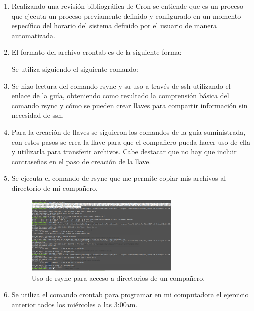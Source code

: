 \documentclass[11pt]{article}
\begin{document}
\begin{enumerate}

 \item Realizando una revisión bibliográfica de Cron se entiende que es un proceso que ejecuta un proceso previamente definido y configurado en un momento específico del horario del sistema definido por el usuario de manera automatizada.\cite{Cron}
 

 
 \item El formato del archivo crontab es de la siguiente forma:
 
 Se utiliza siguiendo el siguiente comando:
 
 



 \item Se hizo lectura del comando rsync y su uso a través de ssh utilizando el enlace de la guía, obteniendo como resultado la comprensión básica del comando rsync y cómo se pueden crear llaves para compartir información sin necesidad de ssh.
 
 \item Para la creación de llaves se siguieron los comandos de la guía suministrada, con estos pasos se crea la llave para que el compañero pueda hacer uso de ella y utilizarla para transferir archivos. Cabe destacar que no hay que incluir contraseñas en el paso de creación de la llave.
 
 \item Se ejecuta el comando de rsync que me permite copiar mis archivos al directorio de mi compañero.
 
\begin{figure}[H]
  \centering
    \includegraphics[width=0.7\textwidth]{img/29}
  \caption{Uso de rsync para acceso a directorios de un compañero.}
\end{figure}


\item Se utiliza el comando crontab para programar en mi computadora el ejercicio anterior todos los miércoles a las 3:00am.

\end{enumerate}
\end{document}
